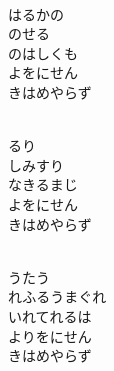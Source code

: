 \documentclass[10pt,b5j]{tarticle} %
\begin{document}
\vspace{1.5em} %
\newcommand{\linespace}{0.5em} %
\newcommand{\blocksize}{0.5\hsize} %
\newcommand{\itemmargin}{3em} %
\begin{enumerate} %
    \setlength{\itemindent}{\itemmargin} %
    \begin{minipage}[c]{\blocksize}
    
        \vspace{\linespace}
        \item~\\
        はるかの\\
        のせる\\
        のはしくも\\
        よをにせん\\
        きはめやらず
        
    \end{minipage}
    \begin{minipage}[c]{\blocksize}
        
        \vspace{\linespace}
        \item~\\
        るり\\
        しみすり\\
        なきるまじ\\
        よをにせん\\
        きはめやらず
        
    \end{minipage}
    \begin{minipage}[c]{\blocksize}
        
        \vspace{\linespace}
        \item~\\
        うたう\\
        れふるうまぐれ\\
        いれてれるは\\
        よりをにせん\\
        きはめやらず
        

\end{minipage}
\end{enumerate}
\end{document}
